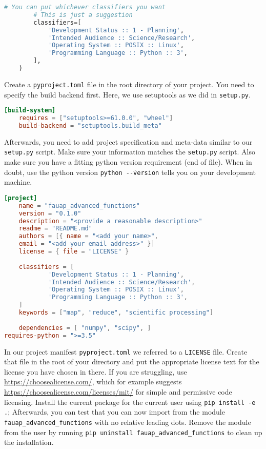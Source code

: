 \documentclass[]{erlangen-problemset}
\begin{document}
\begin{problem}[title={Making our module installable with pip}]
\begin{lstlisting}[language=Python]
        # You can put whichever classifiers you want
        # This is just a suggestion
        classifiers=[
            'Development Status :: 1 - Planning',
            'Intended Audience :: Science/Research',
            'Operating System :: POSIX :: Linux',        
            'Programming Language :: Python :: 3',
        ],
    )
\end{lstlisting}
\Question Create a \texttt{pyproject.toml} file in the root directory of your project. 
You need to specify the build backend first. Here, we use setuptools as we did in \texttt{setup.py}.
\begin{lstlisting}[language=Toml]
[build-system]
    requires = ["setuptools>=61.0.0", "wheel"]
    build-backend = "setuptools.build_meta"
\end{lstlisting}
    Afterwards, you need to add project specification and meta-data similar to our \texttt{setup.py} script.
    Make sure your information matches the \texttt{setup.py} script.
    Also make sure you have a fitting python version requirement (end of file).
    When in doubt, use the python version \texttt{python -\.-version} tells you on your development machine.
\begin{lstlisting}[language=Toml]
[project]
    name = "fauap_advanced_functions"
    version = "0.1.0"
    description = "<provide a reasonable description>"
    readme = "README.md"
    authors = [{ name = "<add your name>", 
    email = "<add your email address>" }]
    license = { file = "LICENSE" }
    
    classifiers = [
            'Development Status :: 1 - Planning',
            'Intended Audience :: Science/Research',
            'Operating System :: POSIX :: Linux',        
            'Programming Language :: Python :: 3',
    ]
    keywords = ["map", "reduce", "scientific processing"]
    
    dependencies = [ "numpy", "scipy", ]
requires-python = ">=3.5"
\end{lstlisting}
\Question In our project manifest \texttt{pyproject.toml} we referred to a \texttt{LICENSE} file. 
Create that file in the root of your directory and put the appropriate license text for the license you have chosen in there. 
If you are struggling, use \url{https://choosealicense.com/}, which for example suggests \url{https://choosealicense.com/licenses/mit/} for simple and permissive code licensing.
\Question Install the current package for the current user using \texttt{pip install -e .}; Afterwards, you can test that you can now import from the module \texttt{fauap\_advanced\_functions} with no relative leading dots. 
\Question Remove the module from the user by running \texttt{pip uninstall fauap\_advanced\_functions} to clean up the installation.
\end{problem}
\end{document}
